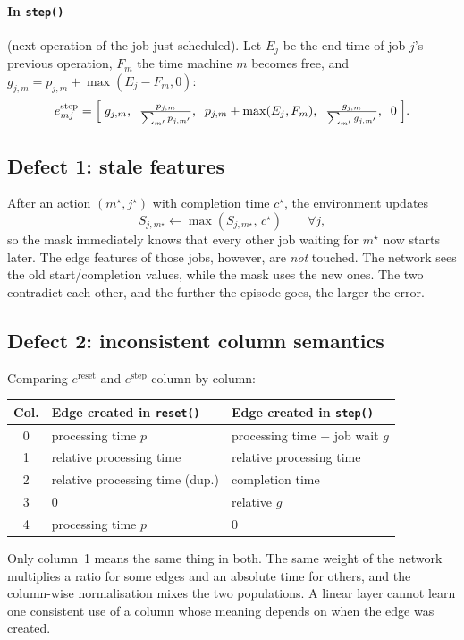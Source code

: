 \documentclass[11pt,a4paper]{article}
\newcommand{\code}[1]{\texttt{#1}}
\theoremstyle{remark}
\begin{document}
\paragraph{In \code{step()}} (next operation of the job just scheduled). Let $E_j$ be the
end time of job $j$'s previous operation, $F_m$ the time machine $m$ becomes free, and
$g_{j,m}=p_{j,m}+\max(E_j-F_m,0)$:
\[
  e^{\mathrm{step}}_{mj} =
  \Bigl[\; g_{j,m},\;\; \tfrac{p_{j,m}}{\sum_{m'} p_{j,m'}},\;\;
        p_{j,m}+\max(E_j,F_m),\;\; \tfrac{g_{j,m}}{\sum_{m'} g_{j,m'}},\;\; 0 \;\Bigr].
\]

\subsection{Defect 1: stale features}
After an action $(m^\star, j^\star)$ with completion time $c^\star$, the environment updates
\[
  S_{j,m^\star} \leftarrow \max(S_{j,m^\star},\, c^\star) \qquad \forall j,
\]
so the mask immediately knows that every other job waiting for $m^\star$ now starts later.
The edge features of those jobs, however, are \emph{not} touched. The network
sees the old start/completion values, while the mask uses the new ones. The two
contradict each other, and the further the episode goes, the larger the error.

\subsection{Defect 2: inconsistent column semantics}
Comparing $e^{\mathrm{reset}}$ and $e^{\mathrm{step}}$ column by column:

\begin{center}
\begin{tabular}{c l l}
\toprule
Col. & Edge created in \code{reset()} & Edge created in \code{step()} \\
\midrule
0 & processing time $p$            & processing time + job wait $g$ \\
1 & relative processing time       & relative processing time \\
2 & relative processing time (dup.)& completion time \\
3 & $0$                            & relative $g$ \\
4 & processing time $p$            & $0$ \\
\bottomrule
\end{tabular}
\end{center}

Only column~1 means the same thing in both. The same weight of the network multiplies
a ratio for some edges and an absolute time for others, and the column-wise normalisation
mixes the two populations. A linear layer cannot learn one consistent use of a column
whose meaning depends on when the edge was created.
\end{document}
